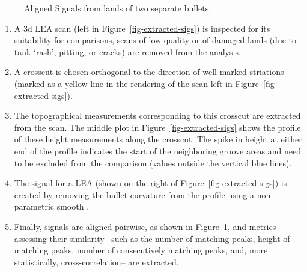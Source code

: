\documentclass[
  12pt]{article}
\begin{document}
\begin{figure}


\caption{\label{fig-aligned-sigs}Aligned Signals from lands of two
separate bullets.}

\end{figure}%

\begin{enumerate}
\def\labelenumi{\arabic{enumi}.}
\item
  A 3d LEA scan (left in Figure~\ref{fig-extracted-sigs}) is inspected
  for its suitability for comparisons, scans of low quality or of
  damaged lands (due to tank `rash', pitting, or cracks) are removed
  from the analysis.
\item
  A crosscut is chosen orthogonal to the direction of well-marked
  striations (marked as a yellow line in the rendering of the scan left
  in Figure~\ref{fig-extracted-sigs}).
\item
  The topographical measurements corresponding to this crosscut are
  extracted from the scan. The middle plot in
  Figure~\ref{fig-extracted-sigs} shows the profile of these height
  measurements along the crosscut. The spike in height at either end of
  the profile indicates the start of the neighboring groove areas and
  need to be excluded from the comparison (values outside the vertical
  blue lines).
\item
  The signal for a LEA (shown on the right of
  Figure~\ref{fig-extracted-sigs}) is created by removing the bullet
  curvature from the profile using a non-parametric smooth
  \citep{clevelandRobustLocallyWeighted1979}.
\item
  Finally, signals are aligned pairwise, as shown in
  Figure~\ref{fig-aligned-sigs}, and metrics assessing their similarity
  --such as the number of matching peaks, height of matching peaks,
  number of consecutively matching peaks, and, more statistically,
  cross-correlation-- are extracted.
\end{enumerate}
\end{document}
